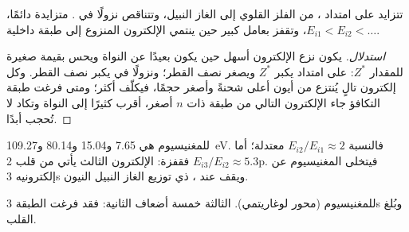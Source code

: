 \begin{proposition}\label{prop:b1:periodicity:ie-trend}
تتزايد  على امتداد ، من الفلز
القلوي إلى الغاز النبيل، وتتناقص نزولًا في .  متزايدة دائمًا، $E_{i1} < E_{i2} < \dots$، وتقفز
بعامل كبير حين ينتمي الإلكترون المنزوع إلى طبقة داخلية.
\end{proposition}

\begin{proof}[استدلال]
يكون نزع الإلكترون أسهل حين يكون بعيدًا عن النواة ويحس
بقيمة صغيرة للمقدار $Z^{*}$: على امتداد  يكبر $Z^{*}$ ويصغر نصف القطر؛
ونزولًا في  يكبر نصف القطر. وكل إلكترون تالٍ يُنتزع من أيون
أعلى شحنةً وأصغر حجمًا، فيكلّف أكثر؛ ومتى فرغت طبقة التكافؤ
جاء الإلكترون التالي من طبقة ذات $n$ أصغر، أقرب كثيرًا
إلى النواة وتكاد لا تُحجب أبدًا.
\end{proof}

\begin{example}[المغنيسيوم]\label{ex:b1:periodicity:magnesium}
 للمغنيسيوم هي 7.65 و15.04 و80.14
و\qty{109.27}{eV}. فالنسبة $E_{i2}/E_{i1} \approx 2$ معتدلة؛
أما $E_{i3}/E_{i2} \approx 5.3$ فقفزة: الإلكترون الثالث يأتي من
قلب 2p. فيتخلى المغنيسيوم عن إلكترونيه 3s ويقف عند
، ذي توزيع الغاز النبيل النيون.
\end{example}

\begin{omfigure}

{\small {} للمغنيسيوم (محور لوغاريتمي).
الثالثة خمسة أضعاف الثانية: فقد فرغت الطبقة 3s وبُلغ
القلب.}
\end{omfigure}

